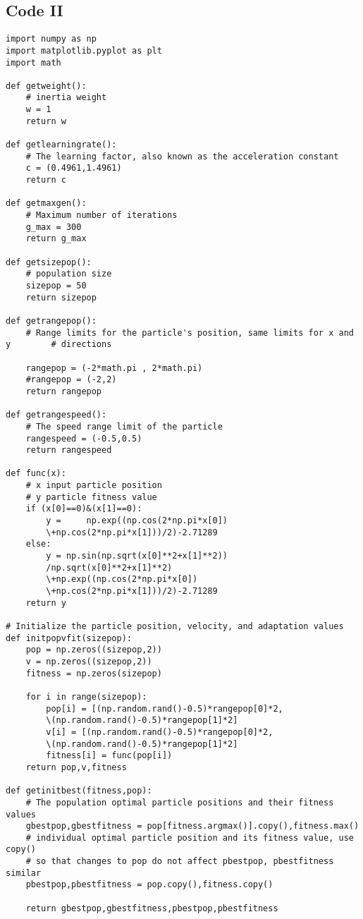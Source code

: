 \documentclass[twocolumn]{article}
\begin{document}
\subsection{Code II}
\begin{lstlisting}
import numpy as np
import matplotlib.pyplot as plt
import math

def getweight():
	# inertia weight
	w = 1
	return w

def getlearningrate():
	# The learning factor, also known as the acceleration constant
	c = (0.4961,1.4961)
	return c

def getmaxgen():
	# Maximum number of iterations
	g_max = 300
	return g_max

def getsizepop():
	# population size
	sizepop = 50
	return sizepop

def getrangepop():
	# Range limits for the particle's position, same limits for x and y    	   # directions
	
	rangepop = (-2*math.pi , 2*math.pi)
	#rangepop = (-2,2)
	return rangepop

def getrangespeed():
	# The speed range limit of the particle
	rangespeed = (-0.5,0.5)
	return rangespeed

def func(x):
	# x input particle position
	# y particle fitness value
	if (x[0]==0)&(x[1]==0):
		y = 	np.exp((np.cos(2*np.pi*x[0])
		\+np.cos(2*np.pi*x[1]))/2)-2.71289
	else:
		y = np.sin(np.sqrt(x[0]**2+x[1]**2))
		/np.sqrt(x[0]**2+x[1]**2)
		\+np.exp((np.cos(2*np.pi*x[0])
		\+np.cos(2*np.pi*x[1]))/2)-2.71289
	return y

# Initialize the particle position, velocity, and adaptation values
def initpopvfit(sizepop):
	pop = np.zeros((sizepop,2))
	v = np.zeros((sizepop,2))
	fitness = np.zeros(sizepop)

	for i in range(sizepop):
		pop[i] = [(np.random.rand()-0.5)*rangepop[0]*2,
		\(np.random.rand()-0.5)*rangepop[1]*2]
		v[i] = [(np.random.rand()-0.5)*rangepop[0]*2,
		\(np.random.rand()-0.5)*rangepop[1]*2]
		fitness[i] = func(pop[i])
	return pop,v,fitness

def getinitbest(fitness,pop):
	# The population optimal particle positions and their fitness values
	gbestpop,gbestfitness = pop[fitness.argmax()].copy(),fitness.max()
	# individual optimal particle position and its fitness value, use copy() 	
	# so that changes to pop do not affect pbestpop, pbestfitness similar
	pbestpop,pbestfitness = pop.copy(),fitness.copy()

	return gbestpop,gbestfitness,pbestpop,pbestfitness  


\end{lstlisting}
\end{document}

